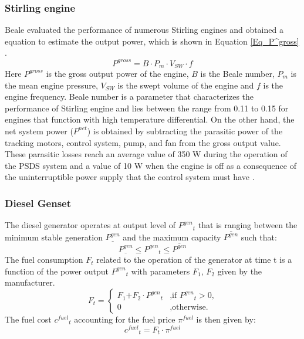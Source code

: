 \documentclass{ECOS_2019}
\begin{document}
\subsubsection{Stirling engine}
Beale evaluated the performance of numerous Stirling engines and obtained a equation to estimate the output power, which is shown in Equation \ref{Eq_P^gross} \cite{Walker1979,Walker1980}.
\begin{equation}
    P^{gross} = B\cdot P_{m}\cdot V_{SW}\cdot f
    \label{Eq_P^gross}
\end{equation}
Here $P^{gross}$ is the gross output power of the engine, $B$ is the Beale number, $P_{m}$ is the mean engine pressure, $V_{SW}$ is the swept volume of the engine and $f$ is the engine frequency. Beale number is a parameter that characterizes the performance of Stirling engine and lies between the range from 0.11 to 0.15 for engines that function with high temperature differential\cite{Fraser2008}.
On the other hand, the net system power ($P^{net}$) is obtained by subtracting the parasitic power of the tracking motors, control system, pump, and fan from the gross output value. These parasitic losses reach an average value of 350 W during the operation of the PSDS system and a value of 10 W when the engine is off as a consequence of the uninterruptible power supply that the control system must have \cite{GavilanConde2011}.
\subsubsection{Diesel Genset}
The diesel generator operates at output level of ${P^{gen}}_t$ that is ranging between the minimum stable generation $\underline{P^{gen}}$ and the maximum capacity $\overline{P^{gen}}$ such that:
\begin{equation}
\underline{P^{gen}}\leq {P^{gen}}_t\leq\overline{P^{gen}}
\end{equation}
The fuel consumption $F_{t}$ related to the operation of the generator at time t is a function of the power output ${P^{gen}}_t$ with parameters $F_1$, $F_2$ given by the manufacturer.
\begin{equation}
F_t =
    \begin{cases}
        \text{$F_1$+$F_2\cdot{P^{gen}}_t$} & \text{,if ${P^{gen}}_t>0$,}\\
        0 & \text{,otherwise.}
    \end{cases}
\end{equation}
The fuel cost ${c^{fuel}}_t$ accounting for the fuel price $\pi^{fuel}$ is then given by:
\begin{equation}
{c^{fuel}}_t = F_t \cdot \pi^{fuel}
\end{equation}
\end{document}
